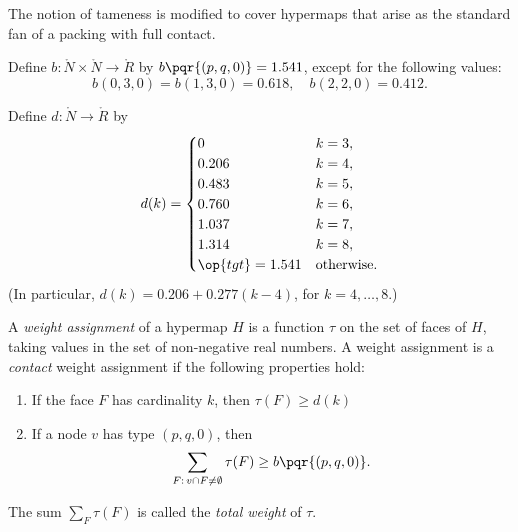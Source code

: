 The notion of tameness is modified to cover hypermaps that arise as
the standard fan of a packing with full contact.
%
%

\begin{definition}[b]
  Define $b:\ring{N}\times \ring{N}\to \ring{R}$ by
  $b\pqr{(p,q,0)}=1.541$, except for the following values:
\begin{displaymath}
b(0,3,0)=b(1,3,0)=0.618,\quad b(2,2,0)=0.412.
\end{displaymath}
\end{definition}
%

\begin{definition}[d]
Define $d:\ring{N}\to \ring{R}$ by
\begin{displaymath}d(k) = \begin{cases}
0 & k=3, \\
0.206 & k=4, \\
0.483 & k=5, \\
0.760 & k=6, \\
1.037 & k=7, \\
1.314 & k=8,\\
\op{tgt}=1.541 & \text{otherwise}.
\end{cases}
\end{displaymath}
(In particular, $d(k) = 0.206 + 0.277 (k-4)$, for $k=4,\ldots,8$.)
\end{definition}
%

\begin{definition}
%
  A {\it weight assignment\/} of a hypermap $H$ is a function $\tau$
  on the set of faces of $H$, taking values in the set of non-negative
  real numbers. A weight assignment is a {\it contact} weight
  assignment if the following properties hold:
%
%
%
%
\begin{enumerate}
\item If the face $F$ has cardinality $k$, then
$\tau(F) \ge d(k)$
\item If a node $v$ has type $(p,q,0)$, then
  \begin{displaymath}\sum_{F:\,v\cap F\ne\emptyset} \tau(F) \ge
    b{\pqr{(p,q,0)}}.\end{displaymath}
\end{enumerate}
The sum $\sum_F \tau(F)$ is called the {\it total weight} of $\tau$.
%
\end{definition}



